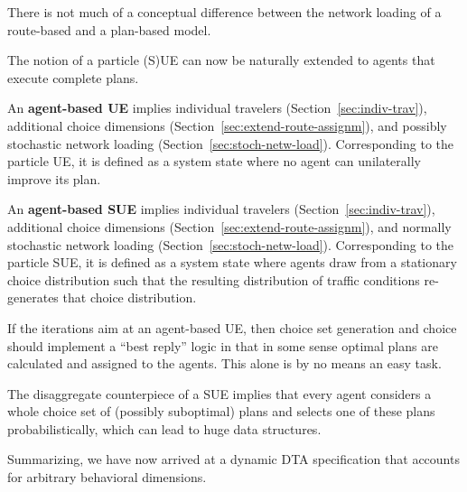 There is not much of a conceptual difference between the network loading of
a route-based and a plan-based model.

The notion of a particle (S)UE can now be naturally extended to agents 
that execute complete plans.

An \textbf{agent-based UE} implies individual travelers
(Section~\ref{sec:indiv-trav}), additional choice dimensions
(Section~\ref{sec:extend-route-assignm}), and possibly stochastic network
loading (Section~\ref{sec:stoch-netw-load}).  Corresponding to the
particle UE, it is defined as a system state where no agent can
unilaterally improve its plan.

An \textbf{agent-based SUE} implies individual travelers
(Section~\ref{sec:indiv-trav}), additional choice dimensions
(Section~\ref{sec:extend-route-assignm}), and normally stochastic network
loading (Section~\ref{sec:stoch-netw-load}).  Corresponding to the
particle SUE, it is defined as a system state where agents draw from a
stationary choice distribution such that the resulting distribution of
traffic conditions re-generates that choice distribution.

If the iterations aim at an agent-based UE, then choice set generation
and choice should implement a ``best reply'' logic in that in some
sense optimal plans are calculated and assigned to the agents. This
alone is by no means an easy task.  

The disaggregate counterpiece of a
SUE implies that every agent considers a whole choice set of (possibly
suboptimal) plans and selects one of these plans probabilistically,
which can lead to huge data structures.

Summarizing, we have now arrived at a dynamic DTA specification that accounts 
for arbitrary behavioral dimensions. 

